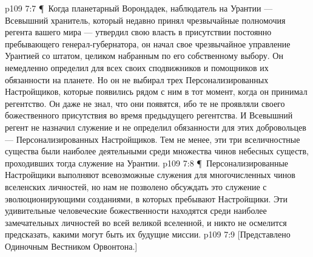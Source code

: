 \vs p109 7:7 \P\ Когда планетарный Ворондадек, наблюдатель на Урантии --- Всевышний хранитель, который недавно принял чрезвычайные полномочия регента вашего мира --- утвердил свою власть в присутствии постоянно пребывающего генерал\hyp{}губернатора, он начал свое чрезвычайное управление Урантией со штатом, целиком набранным по его собственному выбору. Он немедленно определил для всех своих сподвижников и помощников их обязанности на планете. Но он не выбирал трех Персонализированных Настройщиков, которые появились рядом с ним в тот момент, когда он принимал регентство. Он даже не знал, что они появятся, ибо те не проявляли своего божественного присутствия во время предыдущего регентства. И Всевышний регент не назначил служение и не определил обязанности для этих добровольцев --- Персонализированных Настройщиков. Тем не менее, эти три вселичностные существа были наиболее деятельными среди множества чинов небесных существ, проходивших тогда служение на Урантии.
\vs p109 7:8 \P\ Персонализированные Настройщики выполняют всевозможные служения для многочисленных чинов вселенских личностей, но нам не позволено обсуждать это служение с эволюционирующими созданиями, в которых пребывают Настройщики. Эти удивительные человеческие божественности находятся среди наиболее замечательных личностей во всей великой вселенной, и никто не осмелится предсказать, какими могут быть их будущие миссии.
\vs p109 7:9 [Представлено Одиночным Вестником Орвонтона.]
